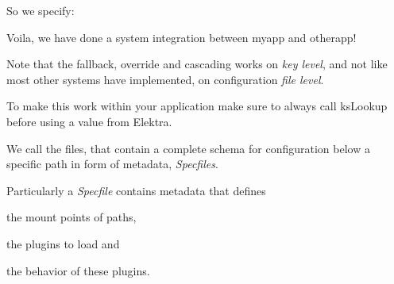 So we specify\+:


\begin{DoxyCode}{0}
\end{DoxyCode}


Voila, we have done a system integration between {\ttfamily myapp} and {\ttfamily otherapp}!

Note that the fallback, override and cascading works on {\itshape key level}, and not like most other systems have implemented, on configuration {\itshape file level}.

To make this work within your application make sure to always call {\ttfamily ks\+Lookup} before using a value from Elektra.

We call the files, that contain a complete schema for configuration below a specific path in form of metadata, {\itshape Specfiles}.

Particularly a {\itshape Specfile} contains metadata that defines


\begin{DoxyItemize}
\item the mount points of paths,
\item the plugins to load and
\item the behavior of these plugins.
\end{DoxyItemize}


\begin{DoxyCode}{0}
\DoxyCodeLine{[]                                         \(\backslash\)}
\DoxyCodeLine{                                           \(\backslash\)}
\end{DoxyCode}


